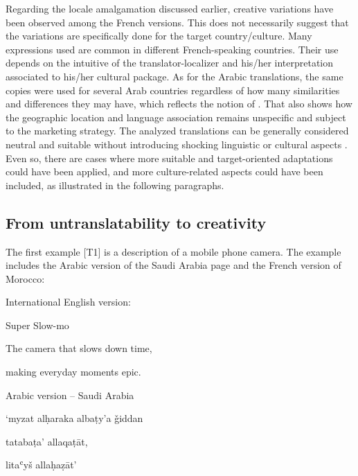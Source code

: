 \documentclass[output=paper]{langsci/langscibook}
\begin{document}
Regarding the locale amalgamation discussed earlier, creative variations have been observed among the French versions. This does not necessarily suggest that the variations are specifically done for the target country/culture. Many expressions used are common in different French-speaking countries. Their use depends on the intuitive of the translator-localizer and his/her interpretation associated to his/her cultural package. As for the Arabic translations, the same copies were used for several Arab countries regardless of how many similarities and differences they may have, which reflects the notion of . That also shows how the geographic location and language association remains unspecific \parencite[26--27]{guidere00} and subject to the marketing strategy. The analyzed translations can be generally considered neutral and suitable without introducing shocking linguistic or cultural aspects \parencite{tatilon90}. Even so, there are cases where more suitable and target-oriented adaptations could have been applied, and more culture-related aspects could have been included, as illustrated in the following paragraphs.

\subsection{From untranslatability to creativity}

The first example [T1] is a description of a mobile phone camera. The example includes the Arabic version of the Saudi Arabia page and the French version of Morocco: 

International English version:

\begin{center}
  Super Slow-mo

  The camera that slows down time,
  
  making everyday moments epic.
\end{center}

Arabic version – Saudi Arabia

\begin{center}
    


\end{center}

\begin{center}
  ‘myzat alḥaraka albaṭy’a ǧiddan

  tatabaṭa’ allaqaṭāt,

  litaʿyš allaḥaẓāt’
\end{center}
\end{document}
